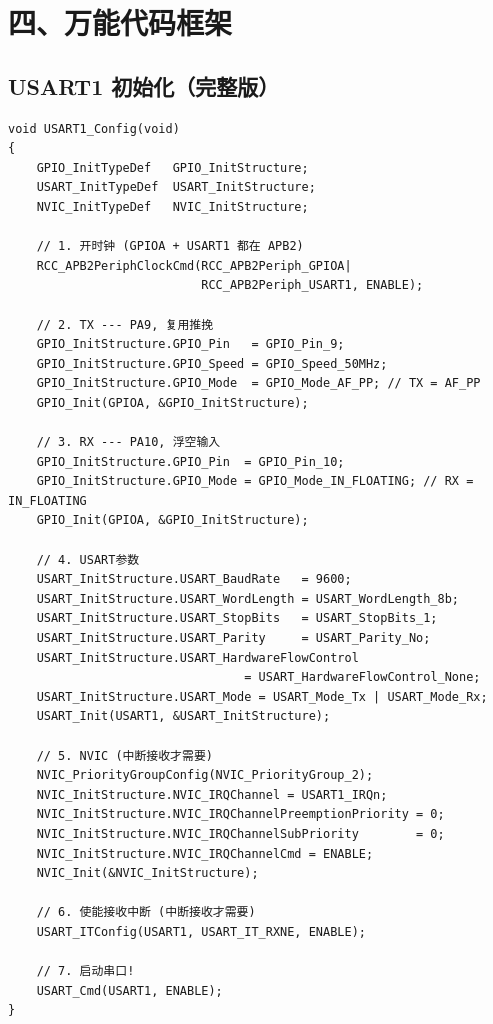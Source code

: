 \documentclass[10pt,a4paper,oneside]{ctexart}
\begin{document}
\section*{四、万能代码框架}

\subsection*{USART1 初始化（完整版）}

\begin{codebox}
\begin{lstlisting}[style=stm32, numbers=none]
void USART1_Config(void)
{
    GPIO_InitTypeDef   GPIO_InitStructure;
    USART_InitTypeDef  USART_InitStructure;
    NVIC_InitTypeDef   NVIC_InitStructure;

    // 1. 开时钟 (GPIOA + USART1 都在 APB2)
    RCC_APB2PeriphClockCmd(RCC_APB2Periph_GPIOA|
                           RCC_APB2Periph_USART1, ENABLE);

    // 2. TX --- PA9, 复用推挽
    GPIO_InitStructure.GPIO_Pin   = GPIO_Pin_9;
    GPIO_InitStructure.GPIO_Speed = GPIO_Speed_50MHz;
    GPIO_InitStructure.GPIO_Mode  = GPIO_Mode_AF_PP; // TX = AF_PP
    GPIO_Init(GPIOA, &GPIO_InitStructure);

    // 3. RX --- PA10, 浮空输入
    GPIO_InitStructure.GPIO_Pin  = GPIO_Pin_10;
    GPIO_InitStructure.GPIO_Mode = GPIO_Mode_IN_FLOATING; // RX = IN_FLOATING
    GPIO_Init(GPIOA, &GPIO_InitStructure);

    // 4. USART参数
    USART_InitStructure.USART_BaudRate   = 9600;
    USART_InitStructure.USART_WordLength = USART_WordLength_8b;
    USART_InitStructure.USART_StopBits   = USART_StopBits_1;
    USART_InitStructure.USART_Parity     = USART_Parity_No;
    USART_InitStructure.USART_HardwareFlowControl
                                 = USART_HardwareFlowControl_None;
    USART_InitStructure.USART_Mode = USART_Mode_Tx | USART_Mode_Rx;
    USART_Init(USART1, &USART_InitStructure);

    // 5. NVIC (中断接收才需要)
    NVIC_PriorityGroupConfig(NVIC_PriorityGroup_2);
    NVIC_InitStructure.NVIC_IRQChannel = USART1_IRQn;
    NVIC_InitStructure.NVIC_IRQChannelPreemptionPriority = 0;
    NVIC_InitStructure.NVIC_IRQChannelSubPriority        = 0;
    NVIC_InitStructure.NVIC_IRQChannelCmd = ENABLE;
    NVIC_Init(&NVIC_InitStructure);

    // 6. 使能接收中断 (中断接收才需要)
    USART_ITConfig(USART1, USART_IT_RXNE, ENABLE);

    // 7. 启动串口!
    USART_Cmd(USART1, ENABLE);
}
\end{lstlisting}
\end{codebox}
\end{document}
